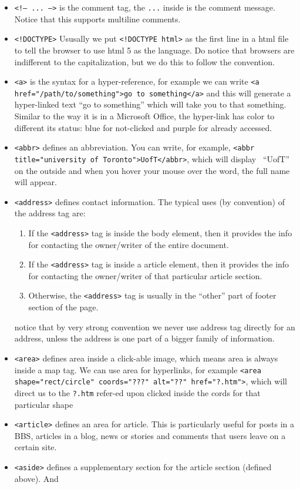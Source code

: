 \documentclass[oneside, 12pt]{article}
\newcommand{\itemm}[1]{\item \texttt{#1}}
\begin{document}
\begin{itemize}
	\itemm{<!-- ... -->} is the comment tag, the \texttt{...} inside is the comment
	message. Notice that this supports multiline comments.
	\itemm{<!DOCTYPE>} Ususally we put \texttt{<!DOCTYPE html>} as the first line in a html file
	to tell the browser to use html 5 as the language. Do notice that browsers are indifferent
	to the capitalization, but we do this to follow the convention.
	\itemm{<a>} is the syntax for a hyper-reference, for example we can write 
	\texttt{<a href="/path/to/something">go to something</a>} and this will generate a hyper-linked
	text ``go to something'' which will take you to that something. Similar to the way it is
	in a Microsoft Office, the hyper-link has color to different its status: blue for not-clicked
	and purple for already accessed. 
	\itemm{<abbr>} defines an abbreviation. You can write, for example, 
	\texttt{<abbr title="university of Toronto">UofT</abbr>}, which will display \, ``UofT'' on the
	outside and when you hover your mouse over the word, the full name will appear.
	\itemm{<address>} defines contact information. The typical uses (by convention) of the address tag are:
		\begin{enumerate}
			\item If the \texttt{<address>} tag is inside the body element, then it provides the info
			for contacting the owner/writer of the entire document.
			\item If the \texttt{<address>} tag is inside a article element, then it provides the info
			for contacting the owner/writer of that particular article section.
			\item Otherwise, the \texttt{<address>} tag is usually in the ``other'' part of footer 
			section of the page.
		\end{enumerate}
		notice that by very strong convention we never use address tag directly for an address, unless 
		the address is one part of a bigger family of information.
	\itemm{<area>} defines area inside a click-able image, which means area is always inside a map tag.
	We can use area for hyperlinks, for example \texttt{<area shape="rect/circle" coords="???" alt="??" href="?.htm">}, 
	which will direct us to the \texttt{?.htm} refer-ed upon clicked inside the cords for that particular shape
	\itemm{<article>} defines an area for article. This is particularly useful for posts in a BBS, articles
	in a blog, news or stories and comments that users leave on a certain site.
	\itemm{<aside>} defines a supplementary section for the article section (defined above). And

\end{itemize}
\end{document}
